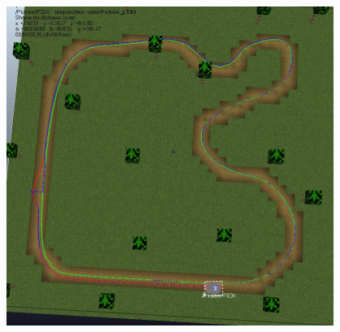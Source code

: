 \documentclass[addpoints]{exam}
\begin{document}
\begin{questions}
\begin{solution}
\includegraphics[width=0.8\textwidth]{image/Q4_screenshot.JPG}

\end{solution}

\end{questions}
\end{document}

